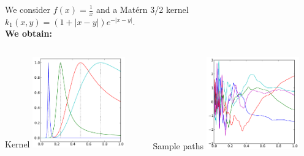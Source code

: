 \documentclass{beamer}
\begin{document}
\begin{frame}{}
\begin{example}
We consider $f(x) = \frac1x$ and a Mat\'ern 3/2 kernel $k_1(x,y) = (1 + |x-y|) e^{-|x-y|}$.\\ \vspace{5mm}
\textbf{We obtain:}
\begin{columns}[c]
\begin{column}{5cm}
\begin{center}
Kernel
\includegraphics[width=4cm]{figures/python/newfromold-compfunc-k}
\end{center}
\end{column}
\begin{column}{5cm}
\begin{center}
Sample paths
\includegraphics[width=4cm]{figures/python/newfromold-compfunc-traj}
\end{center}
\end{column}
\end{columns}
\end{example}
\end{frame}
\end{document}
